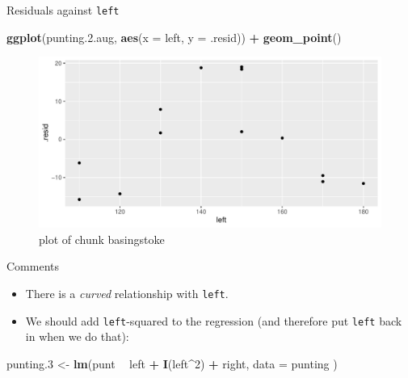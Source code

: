 \documentclass[ignorenonframetext,]{beamer}
\newenvironment{Shaded}{\begin{snugshade}}{\end{snugshade}}
\newcommand{\DataTypeTok}[1]{\textcolor[rgb]{0.13,0.29,0.53}{#1}}
\newcommand{\DecValTok}[1]{\textcolor[rgb]{0.00,0.00,0.81}{#1}}
\newcommand{\FloatTok}[1]{\textcolor[rgb]{0.00,0.00,0.81}{#1}}
\newcommand{\KeywordTok}[1]{\textcolor[rgb]{0.13,0.29,0.53}{\textbf{#1}}}
\newcommand{\NormalTok}[1]{#1}
\newcommand{\OperatorTok}[1]{\textcolor[rgb]{0.81,0.36,0.00}{\textbf{#1}}}
\newcommand{\StringTok}[1]{\textcolor[rgb]{0.31,0.60,0.02}{#1}}
\begin{document}
\begin{frame}[fragile]{Residuals against \texttt{left}}
\protect\hypertarget{residuals-against-left}{}

\begin{Shaded}
\begin{Highlighting}[]
\KeywordTok{ggplot}\NormalTok{(punting.}\FloatTok{2.}\NormalTok{aug, }\KeywordTok{aes}\NormalTok{(}\DataTypeTok{x =}\NormalTok{ left, }\DataTypeTok{y =}\NormalTok{ .resid)) }\OperatorTok{+}
\StringTok{  }\KeywordTok{geom_point}\NormalTok{()}
\end{Highlighting}
\end{Shaded}

\begin{figure}
\centering
\includegraphics{figure/basingstoke-1.pdf}
\caption{plot of chunk basingstoke}
\end{figure}

\end{frame}

\begin{frame}[fragile]{Comments}
\protect\hypertarget{comments-9}{}

\begin{itemize}
\item
  There is a \emph{curved} relationship with \texttt{left}.
\item
  We should add \texttt{left}-squared to the regression (and therefore
  put \texttt{left} back in when we do that):
\end{itemize}

\begin{Shaded}
\begin{Highlighting}[]
\NormalTok{punting}\FloatTok{.3}\NormalTok{ <-}\StringTok{ }\KeywordTok{lm}\NormalTok{(punt }\OperatorTok{~}\StringTok{ }\NormalTok{left }\OperatorTok{+}\StringTok{ }\KeywordTok{I}\NormalTok{(left}\OperatorTok{^}\DecValTok{2}\NormalTok{) }\OperatorTok{+}\StringTok{ }\NormalTok{right,}
  \DataTypeTok{data =}\NormalTok{ punting}
\NormalTok{)}
\end{Highlighting}
\end{Shaded}

\end{frame}
\end{document}
